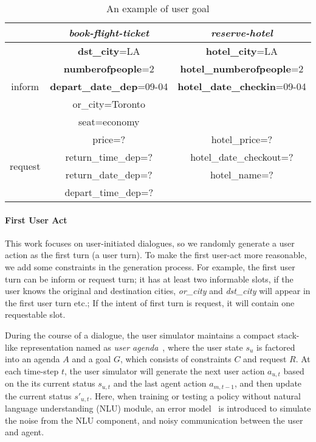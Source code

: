 \documentclass[11pt,letterpaper]{article}
\begin{document}
\begin{table}[htbp]
\small
\centering
\begin{tabular}{|c|c|c|}
\hline 
& \textit{book-flight-ticket} & \textit{reserve-hotel}\\ 
\hline
\multirow{5}{*}{\begin{sideways}inform\end{sideways}} & \textbf{dst\_city}=LA & \textbf{hotel\_city}=LA \\
& \textbf{numberofpeople}=2 & \textbf{hotel\_numberofpeople}=2\\ 
& \textbf{depart\_date\_dep}=09-04 & \textbf{hotel\_date\_checkin}=09-04\\
& or\_city=Toronto &\\
& seat=economy &\\
\hline
\multirow{4}{*}{\begin{sideways}request\end{sideways}}& price=?&hotel\_price=?\\
& return\_time\_dep=?&hotel\_date\_checkout=?\\
& return\_date\_dep=?&hotel\_name=?\\
& depart\_time\_dep=?&\\
\hline
\end{tabular}
\caption{An example of user goal}
\label{tab:user_goal}
\end{table}

\paragraph{First User Act} 
This work focuses on user-initiated dialogues, so we randomly generate a user action as the first turn (a user turn). To make the first user-act more reasonable, we add some constraints in the generation process. For example, the first user turn can be inform or request turn; it has at least two informable slots, if the user knows the original and destination cities, \emph{or\_city} and \emph{dst\_city} will appear in the first user turn etc.; If the intent of first turn is request, it will contain one requestable slot.

During the course of a dialogue, the user simulator maintains a compact stack-like representation named as \emph{user agenda}~\cite{schatzmann2009hidden}, where the user state $s_u$ is factored into an agenda $A$ and a goal $G$, which consists of constraints $C$ and request $R$. At each time-step $t$, the user simulator will generate the next user action $a_{u,t}$ based on the its current status $s_{u,t}$ and the last agent action $a_{m,t-1}$, and then update the current status $s'_{u,t}$. Here, when training or testing a policy without natural language understanding (NLU) module, an error model~\cite{li2017investigation} 
is introduced to simulate the noise from the NLU component, and noisy communication between the user and agent.
\end{document}
